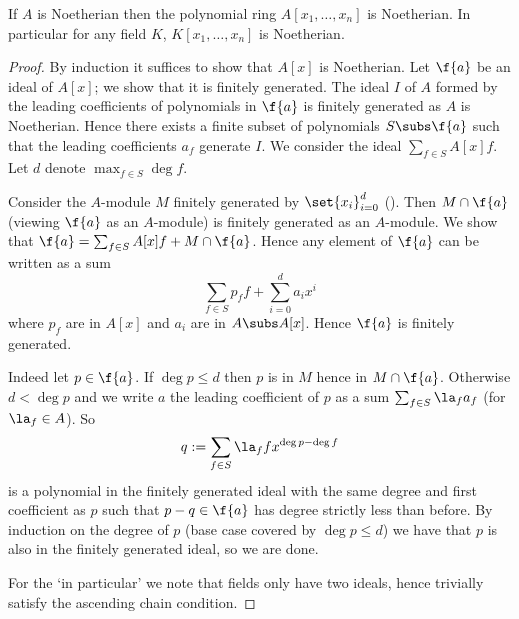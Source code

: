 \begin{prop}
    If $A$ is Noetherian then the polynomial ring $A[x_1, \dots, x_n]$ 
    is Noetherian.
    In particular for any field $K$, $K[x_1, \dots, x_n]$ 
    is Noetherian.
\end{prop}
\begin{proof}
    By induction it suffices to show that $A[x]$ is Noetherian.
    Let $\f{a}$ be an ideal of $A[x]$;
    we show that it is finitely generated.
    The ideal $I$ of $A$ 
    formed by the leading coefficients of polynomials in $\f{a}$
    is finitely generated as $A$ is Noetherian.
    Hence there exists a finite subset of polynomials $S \subs \f{a}$
    such that the leading coefficients $a_f$ generate $I$.
    We consider the ideal $\sum_{f \in S}A[x]f$.
    Let $d$ denote $\max_{f \in S} \deg f$.

    Consider the $A$-module $M$ finitely generated by $\set{x_i}_{i = 0}^d$
    ().
    Then $M \cap \f{a}$ (viewing $\f{a}$ as an $A$-module) is finitely generated
    as an $A$-module.
    We show that $\f{a} = \sum_{f \in S} A[x]f + M \cap \f{a}$.
    Hence any element of $\f{a}$ can be written as a sum 
    \[\sum_{f \in S} p_f f + \sum_{i = 0}^{d} a_i x^i\] 
    where $p_f$ are in $A[x]$ and $a_i$ are in $A \subs A[x]$.
    Hence $\f{a}$ is finitely generated.

    Indeed let $p \in \f{a}$.
    If $\deg p \leq d$ then $p$ is in $M$ hence in $M \cap \f{a}$.
    Otherwise $d < \deg p$ 
    and we write $a$ the leading coefficient of $p$ as a sum 
    $\sum_{f \in S} \la_f a_f$ (for $\la_f \in A$).
    So 
    \[
        q := \sum_{f \in S} \la_f f x^{\deg p - \deg f}
    \]
    is a polynomial in the finitely generated ideal 
    with the same degree and first coefficient as $p$
    such that $p - q \in \f{a}$ has degree strictly less than before.
    By induction on the degree of $p$ (base case covered by $\deg p \leq d$) 
    we have that $p$ is also in the finitely generated ideal,
    so we are done.

    For the `in particular' we note that fields only have two ideals,
    hence trivially satisfy the ascending chain condition.
\end{proof}